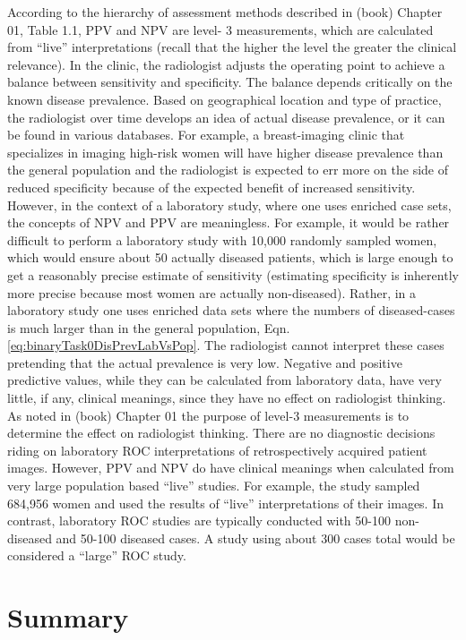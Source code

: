 \documentclass[
]{book}
\begin{document}
According to the hierarchy of assessment methods described in (book) Chapter 01, Table 1.1, PPV and NPV are level- 3 measurements, which are calculated from ``live'' interpretations (recall that the higher the level the greater the clinical relevance). In the clinic, the radiologist adjusts the operating point to achieve a balance between sensitivity and specificity. The balance depends critically on the known disease prevalence. Based on geographical location and type of practice, the radiologist over time develops an idea of actual disease prevalence, or it can be found in various databases. For example, a breast-imaging clinic that specializes in imaging high-risk women will have higher disease prevalence than the general population and the radiologist is expected to err more on the side of reduced specificity because of the expected benefit of increased sensitivity. However, in the context of a laboratory study, where one uses enriched case sets, the concepts of NPV and PPV are meaningless. For example, it would be rather difficult to perform a laboratory study with 10,000 randomly sampled women, which would ensure about 50 actually diseased patients, which is large enough to get a reasonably precise estimate of sensitivity (estimating specificity is inherently more precise because most women are actually non-diseased). Rather, in a laboratory study one uses enriched data sets where the numbers of diseased-cases is much larger than in the general population, Eqn. \eqref{eq:binaryTask0DisPrevLabVsPop}. The radiologist cannot interpret these cases pretending that the actual prevalence is very low. Negative and positive predictive values, while they can be calculated from laboratory data, have very little, if any, clinical meanings, since they have no effect on radiologist thinking. As noted in (book) Chapter 01 the purpose of level-3 measurements is to determine the effect on radiologist thinking. There are no diagnostic decisions riding on laboratory ROC interpretations of retrospectively acquired patient images. However, PPV and NPV do have clinical meanings when calculated from very large population based ``live'' studies. For example, the \citep{RN1902} study sampled 684,956 women and used the results of ``live'' interpretations of their images. In contrast, laboratory ROC studies are typically conducted with 50-100 non-diseased and 50-100 diseased cases. A study using about 300 cases total would be considered a ``large'' ROC study.

\hypertarget{binaryTask0-Summary}{%
\section{Summary}\label{binaryTask0-Summary}}
\end{document}
